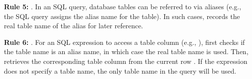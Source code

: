 \textbf{Rule 5:} . In an SQL query,
database tables can be referred to via aliases (e.g., the SQL query
 assigns the alias
name  for the  table). In such cases, \tool{}
records the real table name of the alias for later reference.

\textbf{Rule 6:} . For an SQL expression
to access a table column (e.g., ), \tool{} first checks
if the table name is an alias name, in which case the real table name
is used. Then, \tool{} retrieves the corresponding table column from
the current row . If the expression does not specify a table
name, the only table name in the query will be used.


